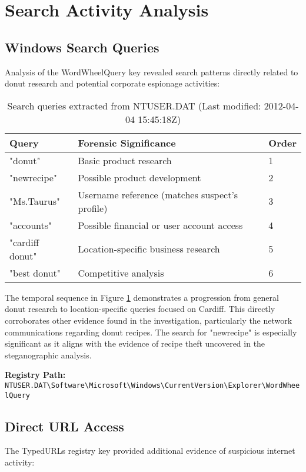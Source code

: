 \section{Search Activity Analysis}
\subsection{Windows Search Queries}
Analysis of the WordWheelQuery key revealed search patterns directly related to donut research and potential corporate espionage activities:

\begin{table}[h]
    \centering
    \begin{tabular}{|l|p{10cm}|l|}
        \hline
        \textbf{Query} & \textbf{Forensic Significance} & \textbf{Order} \\
        \hline
        "donut" & Basic product research & 1 \\
        \hline
        "newrecipe" & Possible product development & 2 \\
        \hline
        "Ms.Taurus" & Username reference (matches suspect's profile) & 3 \\
        \hline
        "accounts" & Possible financial or user account access & 4 \\
        \hline
        "cardiff donut" & Location-specific business research & 5 \\
        \hline
        "best donut" & Competitive analysis & 6 \\
        \hline
    \end{tabular}
    \caption{Search queries extracted from NTUSER.DAT (Last modified: 2012-04-04 15:45:18Z)}
    \label{tab:search_queries}
\end{table}

The temporal sequence in Figure \ref{tab:search_queries} demonstrates a progression from general donut research to location-specific queries focused on Cardiff. This directly corroborates other evidence found in the investigation, particularly the network communications regarding donut recipes. The search for "newrecipe" is especially significant as it aligns with the evidence of recipe theft uncovered in the steganographic analysis.

\textbf{Registry Path:} \texttt{NTUSER.DAT\textbackslash Software\textbackslash Microsoft\textbackslash Windows\textbackslash CurrentVersion\textbackslash Explorer\textbackslash WordWheelQuery}

\subsection{Direct URL Access}
The TypedURLs registry key provided additional evidence of suspicious internet activity:

